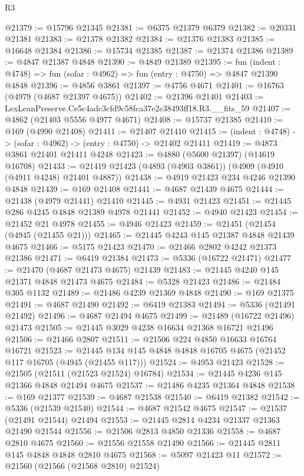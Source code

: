\begin{lexlean}{R3}
\begin{coremodule}
@21379 := @15796 @21345
@21381 := @6375 @21379 @6379
@21382 := @20331 @21381
@21383 := @21378 @21382
@21384 := @21376 @21383
@21385 := @16648 @21384
@21386 := @15734 @21385
@21387 := @21374 @21386
@21389 := @4847 @21387 @4848
@21390 := @4849 @21389
@21395 := fun (indent : @4748) => fun (sofar : @4962) => fun (entry : @4750) => @4847 @21390 @4848
@21396 := @4856 @3861
@21397 := @4756 @4671
@21401 := @16763 (@4979 (@4687 @21397 @4675))
@21402 := @21396 @21401
@21403 := LexLeanPreserve.Ce5c4adc3cfd9c58fca37e2c38493ff18.R3.__fits_59
@21407 := @4862 (@21403 @5556 @4977 @4671)
@21408 := @15737 @21385
@21410 := @169 (@4990 @21408)
@21411 := @21407 @21410
@21415 := (indent : @4748) -> (sofar : @4962) -> (entry : @4750) -> @21402 @21411
@21419 := @4873 @3861 @21401 @21411 @4248
@21423 := @4880 (@5600 @21397) (@14619 @16708)
@21433 := @21419 @21423 (@4893 (@4903 @3861)) (@4909 (@4910 (@4911 @4248) @21401 @4887))
@21438 := @4919 @21423 @234 @4246 @21390 @4848
@21439 := @169 @21408
@21441 := @4687 @21439 @4675
@21444 := @21438 (@4979 @21441) @21410
@21445 := @4931 @21423
@21451 := @21445 @286 @4245 @4848 @21389 @4978 @21441
@21452 := @4940 @21423
@21454 := @21452 @21 @4978
@21455 := @4946 @21423
@21459 := @21451 (@21454 (@4945 (@21455 @21)))
@21465 := @21445 @4243 @145 @21387 @4848 @21439 @4675
@21466 := @5175 @21423
@21470 := @21466 @2802 @4242 @21373 @21386
@21471 := @6419 @21384
@21473 := @5336 (@16722 @21471)
@21477 := @21470 (@4687 @21473 @4675) @21439
@21483 := @21445 @4240 @145 @21371 @4848 @21473 @4675
@21484 := @5328 @21423
@21486 := @21484 @305 @1132
@21489 := @21486 @4239 @21369 @4848
@21490 := @169 @21375
@21491 := @4687 @21490
@21492 := @6419 @21383
@21494 := @5336 (@21491 @21492)
@21496 := @4687 @21494 @4675
@21499 := @21489 (@16722 @21496) @21473
@21505 := @21445 @3029 @4238 @16634 @21368 @16721 @21496
@21506 := @21466 @2807
@21511 := @21506 @224 @4850 @16633 @16764 @16721
@21523 := @21445 @134 @145 @4848 @4848 @16705 @4675 (@21452 @117 @16705 (@4945 (@21455 @117)))
@21524 := @4953 @21423
@21528 := @21505 (@21511 (@21523 @21524) @16784)
@21534 := @21445 @4236 @145 @21366 @4848 @21494 @4675
@21537 := @21486 @4235 @21364 @4848
@21538 := @169 @21377
@21539 := @4687 @21538
@21540 := @6419 @21382
@21542 := @5336 (@21539 @21540)
@21544 := @4687 @21542 @4675
@21547 := @21537 (@21491 @21544) @21494
@21553 := @21445 @2814 @4234 @21337 @21363 @21490 @21544
@21556 := @21506 @2813 @4850 @21336
@21558 := @4687 @2810 @4675
@21560 := @21556 @21558 @21490
@21566 := @21445 @2811 @145 @4848 @4848 @2810 @4675
@21568 := @5097 @21423 @11
@21572 := @21560 (@21566 (@21568 @2810) @21524)

\end{coremodule}
\end{lexlean}
